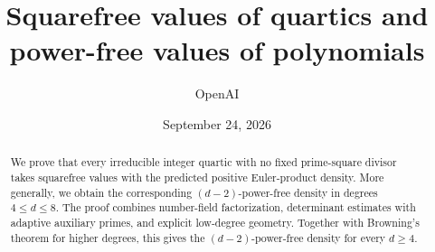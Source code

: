 \documentclass[11pt]{article}
\title{Squarefree values of quartics and power-free values of polynomials}
\author{OpenAI}
\date{September 24, 2026}
\theoremstyle{definition}
\numberwithin{equation}{section}
\begin{document}
\maketitle
\begin{abstract}
We prove that every irreducible integer quartic with no fixed prime-square
divisor takes squarefree values with the predicted positive Euler-product
density. More generally, we obtain the corresponding $(d-2)$-power-free
density in degrees $4\le d\le8$. The proof combines number-field factorization,
determinant estimates with adaptive auxiliary primes, and explicit
low-degree geometry. Together with Browning's theorem for higher degrees,
this gives the $(d-2)$-power-free density for every $d\ge4$.
\end{abstract}
\tableofcontents












\appendix



\end{document}
